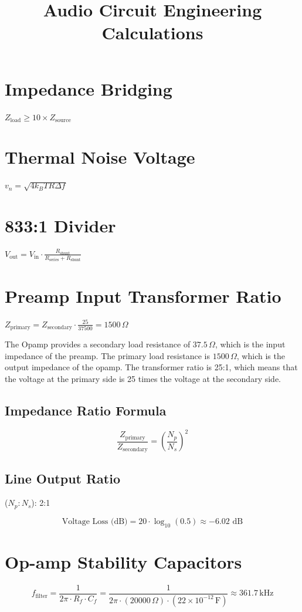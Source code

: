 \documentclass{article}
\title{Audio Circuit Engineering Calculations}
\author{}
\date{}
\begin{document}
	
	\maketitle
	
	\section*{Impedance Bridging}
	$Z_{\text{load}} \ge 10 \times Z_{\text{source}}$
	
	\section*{Thermal Noise Voltage}
	$v_n = \sqrt{4 k_B T R \Delta f}$
	
	\section*{833:1 Divider}
	$V_{\text{out}} = V_{\text{in}} \cdot \frac{R_{\text{shunt}}}{R_{\text{series}} + R_{\text{shunt}}}$
	
	\section*{Preamp Input Transformer Ratio}
	$Z_{\text{primary}} = Z_{\text{secondary}} \cdot \frac{25}{37500} = 1500\,\Omega$
	
	\medskip
	The Opamp provides a secondary load resistance of $37.5\,\Omega$, which is the input impedance of the preamp. The primary load resistance is $1500\,\Omega$, which is the output impedance of the opamp. The transformer ratio is 25:1, which means that the voltage at the primary side is 25 times the voltage at the secondary side.
	
	\subsection*{Impedance Ratio Formula}
	\[ \frac{Z_{\text{primary}}}{Z_{\text{secondary}}} = \left(\frac{N_{p}}{N_{s}}\right)^{2} \]
	
	\subsection*{Line Output Ratio}
	($N_p : N_s$): 2:1 
	
	\[ \text{Voltage Loss (dB)} = 20 \cdot \log_{10}(0.5) \approx \mathbf{-6.02}\text{ dB} \]
	
	\section*{Op-amp Stability Capacitors}
	\[ f_{\text{filter}} = \frac{1}{2\pi \cdot R_f \cdot C_f} = \frac{1}{2\pi \cdot (20000\,\Omega) \cdot (22 \times 10^{-12}\,\text{F})} \approx 361.7\,\text{kHz} \]
	
\end{document}
